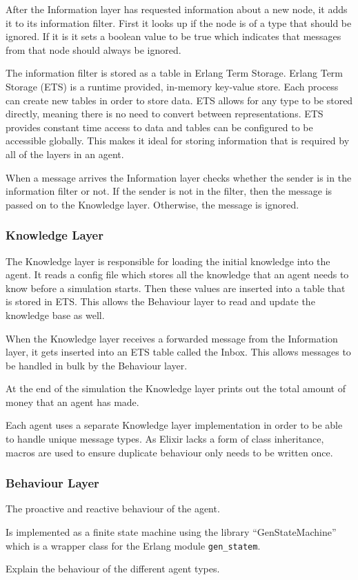 After the Information layer has requested information about a new node, it adds it to its information filter.
First it looks up if the node is of a type that should be ignored.
If it is it sets a boolean value to be true which indicates that messages from that node should always be ignored.

The information filter is stored as a table in Erlang Term Storage.
Erlang Term Storage (ETS) is a runtime provided, in-memory key-value store.
Each process can create new tables in order to store data.
ETS allows for any type to be stored directly, meaning there is no need to convert between representations.
ETS provides constant time access to data and tables can be configured to be accessible globally.
This makes it ideal for storing information that is required by all of the layers in an agent.

When a message arrives the Information layer checks whether the sender is in the information filter or not.
If the sender is not in the filter, then the message is passed on to the Knowledge layer.
Otherwise, the message is ignored.

\subsubsection{Knowledge Layer}

The Knowledge layer is responsible for loading the initial knowledge into the agent.
It reads a config file which stores all the knowledge that an agent needs to know before a simulation starts.
Then these values are inserted into a table that is stored in ETS\@.
This allows the Behaviour layer to read and update the knowledge base as well.

When the Knowledge layer receives a forwarded message from the Information layer, it gets inserted into an ETS table called the Inbox.
This allows messages to be handled in bulk by the Behaviour layer.

At the end of the simulation the Knowledge layer prints out the total amount of money that an agent has made.

Each agent uses a separate Knowledge layer implementation in order to be able to handle unique message types.
As Elixir lacks a form of class inheritance, macros are used to ensure duplicate behaviour only needs to be written once.

\subsubsection{Behaviour Layer}

The proactive and reactive behaviour of the agent.

Is implemented as a finite state machine using the library ``GenStateMachine'' which is a wrapper class for the Erlang module \verb|gen_statem|.

Explain the behaviour of the different agent types.
